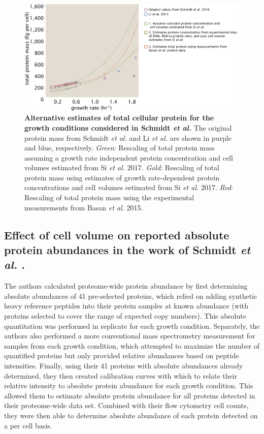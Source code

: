 \begin{figure}
		\centering
    \includegraphics[width=1\textwidth]{SI_figs/schmidt_protein_corrections.pdf}
  \caption{{\bf Alternative estimates of total cellular protein for the growth conditions considered in Schmidt \textit{et al.}} The original protein mass from Schmidt \textit{et al.} and Li \textit{et al.} are shown in purple and blue, respectively. \textit{Green}: Rescaling of total protein mass assuming a growth rate independent protein concentration and cell volumes estimated from Si \textit{et al.} 2017.
  \textit{Gold}:  Rescaling of total protein mass using estimates of growth rate-dependent protein concentrations and cell volumes estimated from Si \textit{et al.} 2017.
  \textit{Red}: Rescaling of total protein mass using the experimental measurements from Basan \textit{et al.} 2015.
	 	}
  \label{fig:schmidt_adjustment_summary}
\end{figure}

\subsection{Effect of cell volume on reported absolute protein abundances in the work of Schmidt \textit{et al.} .}

The authors calculated proteome-wide  protein abundance by first determining
absolute abundances of 41 pre-selected proteins, which relied on adding
synthetic heavy reference peptides into their protein samples at known abundance
(with proteins selected to cover the range of expected copy numbers).  This
absolute quantitation was performed in replicate for each growth condition.
Separately, the authors also performed a more conventional mass spectrometry
measurement for samples from each growth condition, which attempted to maximize
the number of quantified proteins but only provided relative abundances based on
peptide intensities. Finally, using their 41 proteins with absolute abundances
already determined, they then created calibration curves with which to relate
their relative intensity to absolute protein abundance for each growth
condition.  This allowed them to estimate absolute protein abundance for all
proteins detected in their proteome-wide data set. Combined with their flow
cytometry cell counts, they were then able to determine absolute abundance of
each protein detected on a per cell basis.

